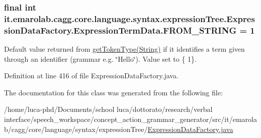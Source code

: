 \hypertarget{classit_1_1emarolab_1_1cagg_1_1core_1_1language_1_1syntax_1_1expressionTree_1_1ExpressionDataFactory_1_1ExpressionTermData_a721daea5805288e2fbe0aa006e41b1bc}{
\subsubsection[{F\-R\-O\-M\-\_\-\-S\-T\-R\-I\-N\-G}]{\setlength{\rightskip}{0pt plus 5cm}final int it.\-emarolab.\-cagg.\-core.\-language.\-syntax.\-expression\-Tree.\-Expression\-Data\-Factory.\-Expression\-Term\-Data.\-F\-R\-O\-M\-\_\-\-S\-T\-R\-I\-N\-G = 1\hspace{0.3cm}{\ttfamily [static]}}}\label{classit_1_1emarolab_1_1cagg_1_1core_1_1language_1_1syntax_1_1expressionTree_1_1ExpressionDataFactory_1_1ExpressionTermData_a721daea5805288e2fbe0aa006e41b1bc}
Default value returned from \hyperlink{classit_1_1emarolab_1_1cagg_1_1core_1_1language_1_1syntax_1_1expressionTree_1_1ExpressionDataFactory_1_1ExpressionTermData_ace7d61d502db7ff1a402ac0e6e983e0a}{get\-Token\-Type(\-String)} if it identifies a term given through an identifier (grammar e.\-g. \char`\"{}\-Hello\char`\"{}). Value set to \{ 1\}. 

Definition at line 416 of file Expression\-Data\-Factory.\-java.



The documentation for this class was generated from the following file\-:\begin{DoxyCompactItemize}
\item 
/home/luca-\/phd/\-Documents/school luca/dottorato/research/verbal interface/speech\-\_\-workspace/concept\-\_\-action\-\_\-grammar\-\_\-generator/src/it/emarolab/cagg/core/language/syntax/expression\-Tree/\hyperlink{ExpressionDataFactory_8java}{Expression\-Data\-Factory.\-java}\end{DoxyCompactItemize}
